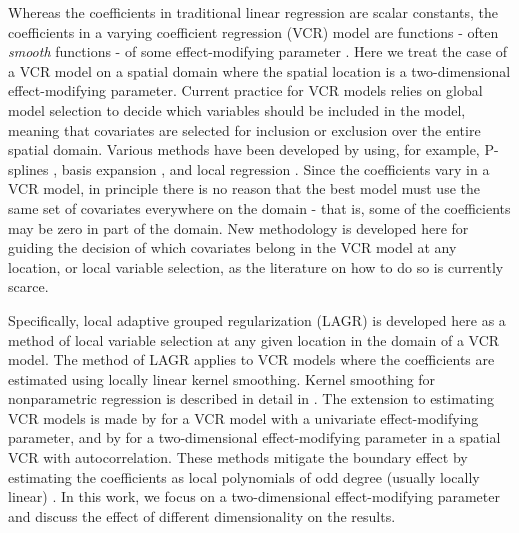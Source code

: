 \documentclass[authoryear,review, 12pt]{elsarticle}
\begin{document}
Whereas the coefficients in traditional linear regression are scalar
constants, the coefficients in a varying coefficient regression (VCR)
model are functions - often \emph{smooth} functions - of some effect-modifying
parameter \citep{Cleveland-Grosse-1991,Hastie-Tibshirani-1993}. Here
we treat the case of a VCR model on a spatial domain where the spatial
location is a two-dimensional effect-modifying parameter. Current
practice for VCR models relies on global model selection to decide
which variables should be included in the model, meaning that covariates
are selected for inclusion or exclusion over the entire spatial domain.
Various methods have been developed by using, for example, P-splines
\citep{Antoniadis:2012a}, basis expansion \citep{Wang-2008a}, and
local regression \citep{Wang-Xia-2009}. Since the coefficients vary
in a VCR model, in principle there is no reason that the best model
must use the same set of covariates everywhere on the domain - that
is, some of the coefficients may be zero in part of the domain. New
methodology is developed here for guiding the decision of which covariates
belong in the VCR model at any location, or local variable selection,
as the literature on how to do so is currently scarce.

Specifically, local adaptive grouped regularization (LAGR) is developed
here as a method of local variable selection at any given location
in the domain of a VCR model. The method of LAGR applies to VCR models
where the coefficients are estimated using locally linear kernel smoothing.
Kernel smoothing for nonparametric regression is described in detail
in \citet*{Fan-Gijbels-1996}. The extension to estimating VCR models
is made by \citet{Fan-Zhang-1999} for a VCR model with a univariate
effect-modifying parameter, and by \citet{Sun-Yan-Zhang-Lu-2014}
for a two-dimensional effect-modifying parameter in a spatial VCR
with autocorrelation. These methods mitigate the boundary effect by
estimating the coefficients as local polynomials of odd degree (usually
locally linear) \citep{Hastie:1993b}. In this work, we focus on a
two-dimensional effect-modifying parameter and discuss the effect
of different dimensionality on the results.
\end{document}
